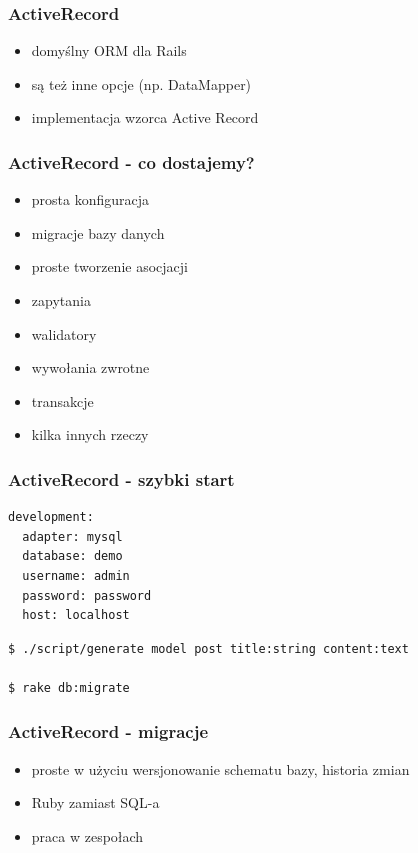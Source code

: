 \documentclass[12t]{beamer}
\begin{document}
\begin{frame}
  \frametitle{ActiveRecord}
  \begin{itemize}
  \item domyślny ORM dla Rails
  \item są też inne opcje (np. DataMapper)
  \item implementacja wzorca Active Record
  \end{itemize}
\end{frame}

\begin{frame}
  \frametitle{ActiveRecord - co dostajemy?}
  \begin{itemize}
  \item prosta konfiguracja
  \item migracje bazy danych
  \item proste tworzenie asocjacji
  \item zapytania
  \item walidatory
  \item wywołania zwrotne
  \item transakcje
  \item kilka innych rzeczy
  \end{itemize}
\end{frame}

\begin{frame}[fragile]
  \frametitle{ActiveRecord - szybki start}
\begin{verbatim}
development:
  adapter: mysql
  database: demo
  username: admin
  password: password
  host: localhost
\end{verbatim}
\begin{verbatim}
$ ./script/generate model post title:string content:text

$ rake db:migrate
\end{verbatim}
  
\end{frame}

\begin{frame}
  \frametitle{ActiveRecord - migracje}
  \begin{itemize}
  \item proste w użyciu wersjonowanie schematu bazy, historia zmian
  \item Ruby zamiast SQL-a
  \item praca w zespołach
  \end{itemize}
\end{frame}
\end{document}
